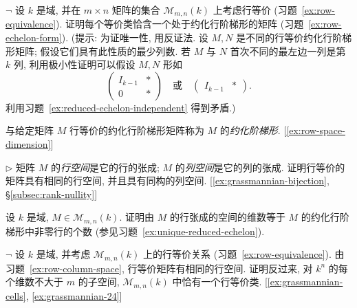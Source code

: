 \begin{prob}
\label{ex:unique-reduced-echelon}
$\neg$ 设 $k$ 是域, 并在 $m\times n$ 矩阵的集合 $\mathcal{M}_{m,n}(k)$ 上考虑行等价 (习题~\ref{ex:row-equivalence}). 证明每个等价类恰含一个处于约化行阶梯形的矩阵 (习题~\ref{ex:row-echelon-form}). (提示: 为证唯一性, 用反证法. 设 $M,N$ 是不同的行等价约化行阶梯形矩阵; 假设它们具有此性质的最少列数. 若 $M$ 与 $N$ 首次不同的最左边一列是第 $k$ 列, 利用极小性证明可以假设 $M,N$ 形如
\[
\begin{pmatrix} I_{k-1} & *\\ \hline 0 & *\end{pmatrix}
\quad\text{或}\quad
\begin{pmatrix} I_{k-1} & *\end{pmatrix}.
\]
利用习题~\ref{ex:reduced-echelon-independent} 得到矛盾.)

与给定矩阵 $M$ 行等价的约化行阶梯形矩阵称为 $M$ 的\emph{约化阶梯形}. [\ref{ex:row-space-dimension}]
\end{prob}

\begin{prob}
\label{ex:row-column-space}
$\triangleright$ 矩阵 $M$ 的\emph{行空间}是它的行的张成; $M$ 的\emph{列空间}是它的列的张成. 证明行等价的矩阵具有相同的行空间, 并且具有同构的列空间. [\ref{ex:grassmannian-bijection}, §\ref{subsec:rank-nullity}]
\end{prob}

\begin{prob}
\label{ex:row-space-dimension}
设 $k$ 是域, $M\in\mathcal{M}_{m,n}(k)$. 证明由 $M$ 的行张成的空间的维数等于 $M$ 的约化行阶梯形中非零行的个数 (参见习题~\ref{ex:unique-reduced-echelon}).
\end{prob}

\begin{prob}
\label{ex:grassmannian-bijection}
$\neg$ 设 $k$ 是域, 并考虑 $\mathcal M_{m,n}(k)$ 上的行等价关系 (习题~\ref{ex:row-equivalence}). 由习题~\ref{ex:row-column-space}, 行等价矩阵有相同的行空间. 证明反过来, 对 $k^n$ 的每个维数不大于 $m$ 的子空间, $\mathcal M_{m,n}(k)$ 中恰有一个行等价类. [\ref{ex:grassmannian-cells}, \ref{ex:grassmannian-24}]
\end{prob}

